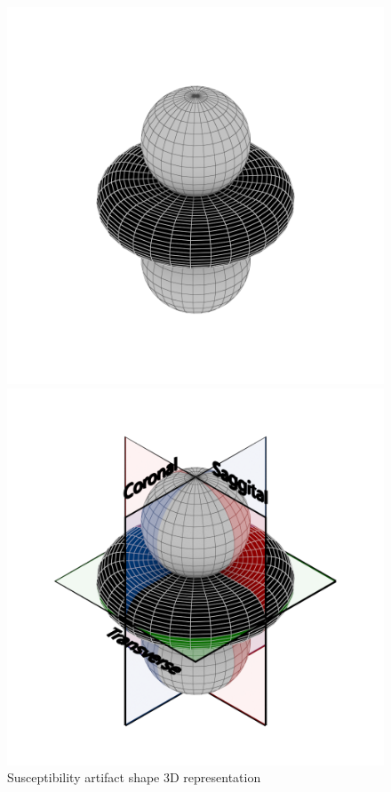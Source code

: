 \documentclass{article}
\begin{document}
\begin{figure}[h]
    \centering
    \begin{minipage}{0.45\textwidth}
        \centering
        \includegraphics[width=\textwidth]{img/sus-iso-clean.png}
    \end{minipage}\hfill
    \begin{minipage}{0.45\textwidth}
        \centering
        \includegraphics[width=\textwidth]{img/sus-iso.png}
    \end{minipage}\hfill
    \caption{Susceptibility artifact shape 3D representation}
    \label{fig:sus-representation}
\end{figure}
\end{document}
